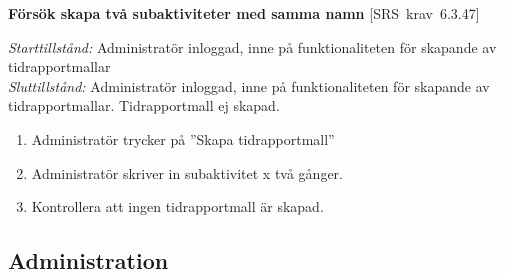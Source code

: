 \documentclass[a4paper]{article}
\def\reqinside{\hfil\penalty 100 \hfilneg \hbox}
\def \req [#1]{\reqinside{[SRS krav #1]}}
\begin{document}
\begin{FT}
\item
\textbf{Försök skapa två subaktiviteter med samma namn} \req[6.3.47]

\emph{Starttillstånd:} Administratör inloggad, inne på funktionaliteten för skapande av tidrapportmallar\\
\emph{Sluttillstånd:} Administratör inloggad, inne på funktionaliteten för skapande av tidrapportmallar. Tidrapportmall ej skapad.\\

\begin{enumerate}
\item Administratör trycker på ''Skapa tidrapportmall''
\item Administratör skriver in subaktivitet x två gånger.
\item Kontrollera att ingen tidrapportmall är skapad.
\end{enumerate}

\end{FT}






\subsection{Administration}
\end{document}
